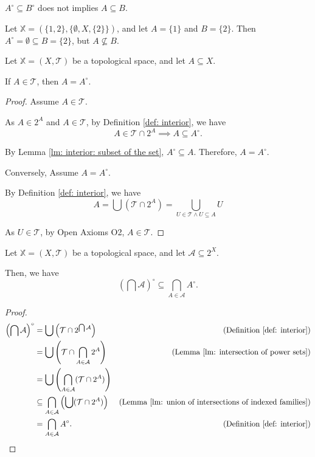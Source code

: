 \begin{note}
	$A^\circ \subseteq B^\circ$ does not implies $A \subseteq B$.
	
	Let $\mathbb X = (\{1,2\}, \{\emptyset, X, \{2\} \})$, and let $A = \{1\}$ and $B = \{2\}$. Then $A^\circ = \emptyset \subseteq B = \{2\}$, but $A \not \subseteq B$.
\end{note}


\begin{lemma}
	Let $\mathbb X = (X, \mathcal T)$ be a topological space, and let $A \subseteq X$.
	
	If $A \in \mathcal T$, then $A = A^\circ$.
	
	\begin{proof}
		Assume $A \in \mathcal T$.
		
		As $A \in 2^A$ and $A \in \mathcal T$, by Definition \ref{def: interior}, we have
		$$
		A \in \mathcal T \cap 2^A \implies A \subseteq A^\circ.
		$$
		
		By Lemma \ref{lm: interior: subset of the set}, $A^\circ \subseteq A$. Therefore, $A = A^\circ$.
		\qedlm
		
		Conversely, Assume $A = A^\circ$.
		
		By Definition \ref{def: interior}, we have
		$$
		A = \bigcup (\mathcal T \cap 2^A) = \bigcup_{U \in \mathcal T \land U \subseteq A} U
		$$
		
		As $U \in \mathcal T$, by Open Axioms O2, $A \in \mathcal T$.
	\end{proof}
\end{lemma}


\begin{lemma}
	\label{lm: interior of union}
	Let $\mathbb X = (X, \mathcal T)$ be a topological space, and let $\mathcal A \subseteq 2^X$.
	
	Then, we have
	$$
	\left( \bigcap \mathcal A \right)^\circ \subseteq \bigcap_{A \in \mathcal A} A^\circ.
	$$
	
	\begin{proof}
		$$
		\begin{aligned}
			\left( \bigcap \mathcal A \right)^\circ &= \bigcup \left(\mathcal T \cap 2^{\bigcap \mathcal A}\right)
			& \text{(Definition \ref{def: interior})}
			\\
			&= \bigcup \left( \mathcal T \cap \bigcap_{A \in \mathcal A} 2^A \right)
			& \text{(Lemma \ref{lm: intersection of power sets})}
			\\
			&= \bigcup \left( \bigcap_{A \in \mathcal A} (\mathcal T \cap 2^A) \right) \\
			&\subseteq \bigcap_{A \in \mathcal A} \left( \bigcup (\mathcal T \cap 2^A) \right) 
			&\text{(Lemma \ref{lm: union of intersections of indexed families})}
			\\
			&= \bigcap_{A \in \mathcal A} A^\circ.
			&\text{(Definition \ref{def: interior})}
		\end{aligned}
		$$
	\end{proof}
\end{lemma}


